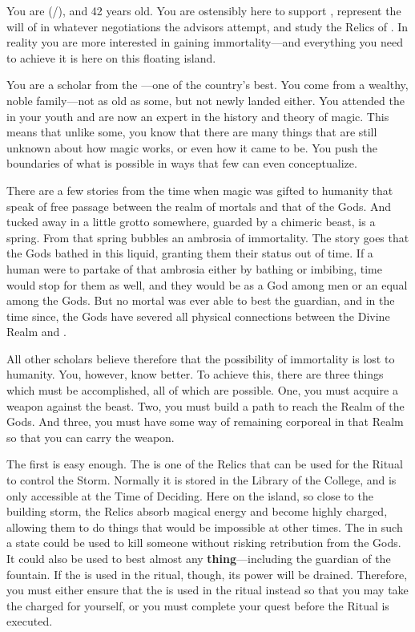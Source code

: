 \documentclass[char]{GL2020}
\begin{document}
\name{\cWildCard{}}

You are \cWildCard{\full} (\cWildCard{\they}/\cWildCard{\them}), and 42 years old. You are ostensibly here to support \cEvil{\full}, represent the will of \cQueen{\Majesty} \cQueen{} in whatever negotiations the advisors attempt, and study the Relics of \pEarth{}. In reality you are more interested in gaining immortality---and everything you need to achieve it is here on this floating island.

You are a scholar from the \pFarm{}---one of the country’s best. You come from a wealthy, noble family---not as old as some, but not newly landed either. You attended the \pSchool{} in your youth and are now an expert in the history and theory of magic. This means that unlike some, you know that there are many things that are still unknown about how magic works, or even how it came to be. You push the boundaries of what is possible in ways that few can even conceptualize.

There are a few stories from the time when magic was gifted to humanity that speak of free passage between the realm of mortals and that of the Gods. And tucked away in a little grotto somewhere, guarded by a chimeric beast, is a spring. From that spring bubbles an ambrosia of immortality. The story goes that the Gods bathed in this liquid, granting them their status out of time. If a human were to partake of that ambrosia either by bathing or imbibing, time would stop for them as well, and they would be as a God among men or an equal among the Gods. But no mortal was ever able to best the guardian, and in the time since, the Gods have severed all physical connections between the Divine Realm and \pEarth{}.

All other scholars believe therefore that the possibility of immortality is lost to humanity. You, however, know better. To achieve this, there are three things which must be accomplished, all of which are possible. One, you must acquire a weapon against the beast. Two, you must build a path to reach the Realm of the Gods.  And three, you must have some way of remaining corporeal in that Realm so that you can carry the weapon.

The first is easy enough. The \iScythe{} is one of the \pFarm{} Relics that can be used for the Ritual to control the Storm. Normally it is stored in the Library of the College, and is only accessible at the Time of Deciding. Here on the island, so close to the building storm, the Relics absorb magical energy and become highly charged, allowing them to do things that would be impossible at other times. The \iScythe{} in such a state could be used to kill someone without risking retribution from the Gods. It could also be used to best almost any \textbf{thing}---including the guardian of the fountain. If the \iScythe{} is used in the ritual, though, its power will be drained. Therefore, you must either ensure that the \iPitcher{} is used in the ritual instead so that you may take the charged \iScythe{} for yourself, or you must complete your quest before the Ritual is executed.
\end{document}
